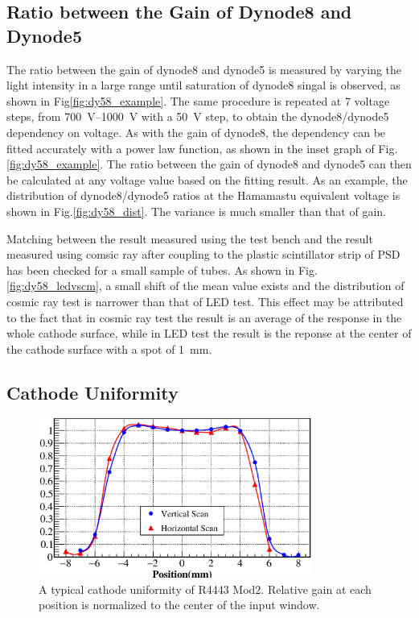 \documentclass[review,number,sort&compress]{elsarticle}
\begin{document}
\subsection{Ratio between the Gain of Dynode8 and Dynode5}
\label{sec:psd_dy58}

The ratio between the gain of dynode8 and dynode5 is measured by varying the light intensity in a large range until saturation of dynode8 singal is observed, as shown in Fig\ref{fig:dy58_example}.
The same procedure is repeated at 7 voltage steps, from \SIrange{700}{1000}{\volt} with a \SI{50}{\volt} step, to obtain the dynode8/dynode5 dependency on voltage.
As with the gain of dynode8, the dependency can be fitted accurately with a power law function, as shown in the inset graph of Fig.\ref{fig:dy58_example}.
The ratio between the gain of dynode8 and dynode5 can then be calculated at any voltage value based on the fitting result.
As an example, the distribution of dynode8/dynode5 ratios at the Hamamastu equivalent voltage is shown in Fig.\ref{fig:dy58_dist}.
The variance is much smaller than that of gain.

Matching between the result measured using the test bench and the result measured using comsic ray after coupling to the plastic scintillator strip of PSD has been checked for a small sample of tubes.
As shown in Fig.\ref{fig:dy58_ledvscm}, a small shift of the mean value exists and the distribution of cosmic ray test is narrower than that of LED test. 
This effect may be attributed to the fact that in cosmic ray test the result is an average of the response in the whole cathode surface, while in LED test the result is the reponse at the center of the cathode surface with a spot of \SI{1}{\milli\meter}.


\subsection{Cathode Uniformity}
\label{sec:psd_cathodescan}

\begin{figure}
 \centering
 \includegraphics[width=90mm]{cathode_uniformity}
\caption{A typical cathode uniformity of R4443 Mod2.
Relative gain at each position is normalized to the center of the input window.}
\label{fig:cathode_uniformity}
\end{figure} 
\end{document}
